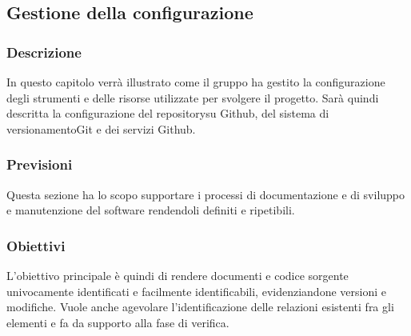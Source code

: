 \subsection{Gestione della configurazione}
	\subsubsection{Descrizione}
		In questo capitolo verrà illustrato come il gruppo ha gestito la configurazione degli strumenti e delle risorse utilizzate per svolgere il progetto.
		Sarà quindi descritta la configurazione del repository\glosp su Github, del sistema di versionamento\glosp Git e dei servizi Github.
	\subsubsection{Previsioni}
		Questa sezione ha lo scopo supportare i processi di documentazione e di sviluppo e manutenzione del software rendendoli definiti e ripetibili.  
	\subsubsection{Obiettivi} 
		L'obiettivo principale è quindi di rendere documenti e codice sorgente univocamente identificati e facilmente identificabili, evidenziandone versioni e modifiche. Vuole anche agevolare l'identificazione delle relazioni esistenti fra gli elementi e fa da supporto alla fase di verifica.

